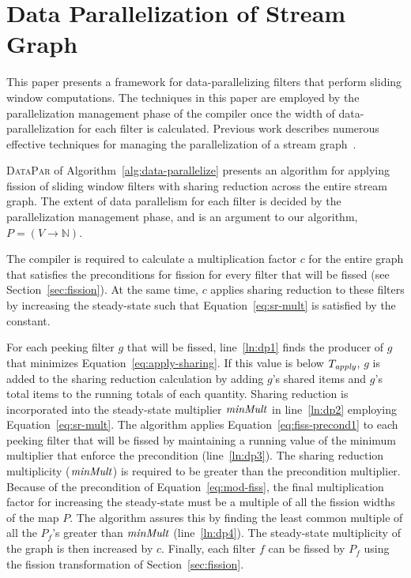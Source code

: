 \section{Data Parallelization of Stream Graph}
\label{sec:data-par}

This paper presents a framework for data-parallelizing filters that
perform sliding window computations.  The techniques in this paper are
employed by the parallelization management phase of the compiler once
the width of data-parallelization for each filter is calculated.
Previous work describes numerous effective techniques for managing the
parallelization of a stream
graph~\cite{kudlur08,gordon-asplos06,flextream,udupa09-gpu,liao06brook}.

\textsc{DataPar} of Algorithm~\ref{alg:data-parallelize} presents an
algorithm for applying fission of sliding window filters with sharing
reduction across the entire stream graph.  The extent of data
parallelism for each filter is decided by the parallelization
management phase, and is an argument to our algorithm, $P=(V
\rightarrow \mathbb{N})$. 

The compiler is required to calculate a multiplication factor $c$ for
the entire graph that satisfies the preconditions for fission for
every filter that will be fissed (see Section~\ref{sec:fission}).  At
the same time, $c$ applies sharing reduction to these filters by
increasing the steady-state such that Equation~\ref{eq:sr-mult} is
satisfied by the constant.

For each peeking filter $g$ that will be fissed, line~\ref{ln:dp1}
finds the producer of $g$ that minimizes
Equation~\ref{eq:apply-sharing}.  If this value is below
$T_{\relax{\it apply}}$, $g$ is added to the sharing reduction calculation by
adding $g$'s shared items and $g$'s total items to the running totals
of each quantity.  Sharing reduction is incorporated into the
steady-state multiplier $\relax{\it minMult}$ in line~\ref{ln:dp2} employing
Equation~\ref{eq:sr-mult}.  The algorithm applies
Equation~\ref{eq:fiss-precond1} to each peeking filter that will be
fissed by maintaining a running value of the minimum multiplier that
enforce the precondition (line~\ref{ln:dp3}).  The sharing reduction
multiplicity ($\relax{\it minMult}$) is required to be greater than the
precondition multiplier.  Because of the precondition of
Equation~\ref{eq:mod-fiss}, the final multiplication factor for
increasing the steady-state must be a multiple of all the fission
widths of the map $P$. The algorithm assures this by finding the least
common multiple of all the $P_f$'s greater than $\relax{\it minMult}$
(line~\ref{ln:dp4}).  The steady-state multiplicity of the graph is
then increased by $c$.  Finally, each filter $f$ can be fissed by $P_f$
using the fission transformation of Section~\ref{sec:fission}.

